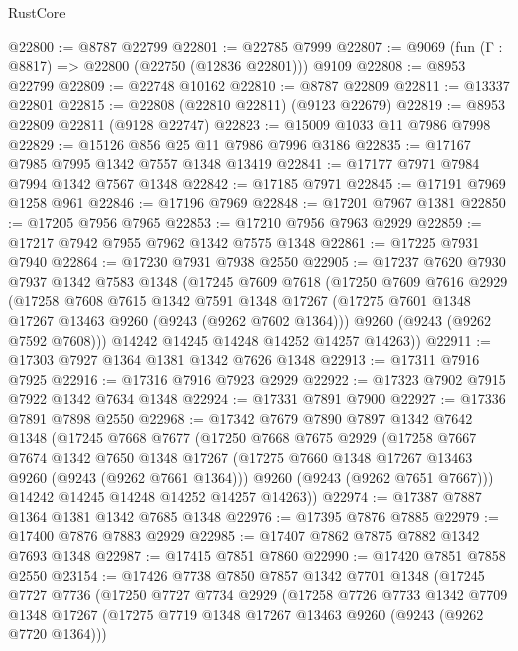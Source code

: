 \begin{lexlean}{RustCore}
\begin{coremodule}
@22800 := @8787 @22799
@22801 := @22785 @7999
@22807 := @9069 (fun (Γ : @8817) => @22800 (@22750 (@12836 @22801))) @9109
@22808 := @8953 @22799
@22809 := @22748 @10162
@22810 := @8787 @22809
@22811 := @13337 @22801
@22815 := @22808 (@22810 @22811) (@9123 @22679)
@22819 := @8953 @22809 @22811 (@9128 @22747)
@22823 := @15009 @1033 @11 @7986 @7998
@22829 := @15126 @856 @25 @11 @7986 @7996 @3186
@22835 := @17167 @7985 @7995 @1342 @7557 @1348 @13419
@22841 := @17177 @7971 @7984 @7994 @1342 @7567 @1348
@22842 := @17185 @7971
@22845 := @17191 @7969 @1258 @961
@22846 := @17196 @7969
@22848 := @17201 @7967 @1381
@22850 := @17205 @7956 @7965
@22853 := @17210 @7956 @7963 @2929
@22859 := @17217 @7942 @7955 @7962 @1342 @7575 @1348
@22861 := @17225 @7931 @7940
@22864 := @17230 @7931 @7938 @2550
@22905 := @17237
    @7620
    @7930
    @7937
    @1342
    @7583
    @1348
    (@17245
      @7609
      @7618
      (@17250
        @7609
        @7616
        @2929
        (@17258
          @7608
          @7615
          @1342
          @7591
          @1348
          @17267
          (@17275 @7601 @1348 @17267 @13463 @9260 (@9243 (@9262 @7602 @1364)))
          @9260
          (@9243 (@9262 @7592 @7608)))
        @14242
        @14245
        @14248
        @14252
        @14257
        @14263))
@22911 := @17303 @7927 @1364 @1381 @1342 @7626 @1348
@22913 := @17311 @7916 @7925
@22916 := @17316 @7916 @7923 @2929
@22922 := @17323 @7902 @7915 @7922 @1342 @7634 @1348
@22924 := @17331 @7891 @7900
@22927 := @17336 @7891 @7898 @2550
@22968 := @17342
    @7679
    @7890
    @7897
    @1342
    @7642
    @1348
    (@17245
      @7668
      @7677
      (@17250
        @7668
        @7675
        @2929
        (@17258
          @7667
          @7674
          @1342
          @7650
          @1348
          @17267
          (@17275 @7660 @1348 @17267 @13463 @9260 (@9243 (@9262 @7661 @1364)))
          @9260
          (@9243 (@9262 @7651 @7667)))
        @14242
        @14245
        @14248
        @14252
        @14257
        @14263))
@22974 := @17387 @7887 @1364 @1381 @1342 @7685 @1348
@22976 := @17395 @7876 @7885
@22979 := @17400 @7876 @7883 @2929
@22985 := @17407 @7862 @7875 @7882 @1342 @7693 @1348
@22987 := @17415 @7851 @7860
@22990 := @17420 @7851 @7858 @2550
@23154 := @17426
    @7738
    @7850
    @7857
    @1342
    @7701
    @1348
    (@17245
      @7727
      @7736
      (@17250
        @7727
        @7734
        @2929
        (@17258
          @7726
          @7733
          @1342
          @7709
          @1348
          @17267
          (@17275 @7719 @1348 @17267 @13463 @9260 (@9243 (@9262 @7720 @1364)))

\end{coremodule}
\end{lexlean}
